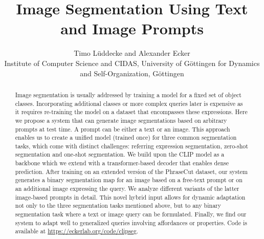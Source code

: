 \documentclass[10pt,twocolumn,letterpaper]{article}
\begin{document}
\title{
Image Segmentation Using Text and Image Prompts
}

\date{}

\author{
Timo Lüddecke and Alexander Ecker \\
\small Institute of Computer Science and CIDAS, University of Göttingen \hspace{1cm}
\smallMPI for Dynamics and Self-Organization, Göttingen
}


\maketitle


\def\todo#1{{ \color{blue}{TODO: #1} } }
\def\new{{ \color{red}{new} } }
\def\remark#1{{ \color{cyan}{#1} } }
\def\question#1{{ \color{orange}{Q: #1} } }

\def\conf#1{}

\newcommand{\x}{\mathbf{x}}
\newcommand{\y}{\mathbf{y}}
\newcommand{\xv}{\mathbf{x}}
\newcommand{\yv}{\mathbf{y}}
\newcommand{\tv}{\mathbf{t}}
\newcommand{\cv}{\mathbf{c}}
\newcommand{\pred}{\mathbf{p}}
\newcommand{\gt}{\mathbf{g}}
\newcommand{\miou}{\text{mIoU}}
\newcommand{\ioufg}{\text{IoU}_{\text{FG}}}
\newcommand{\ioubin}{\text{IoU}_{\text{BIN}}}





\begin{abstract}


Image segmentation is usually addressed by training a model for a fixed set of object classes. Incorporating additional classes or more complex queries later is expensive as it requires re-training the model on a dataset that encompasses these expressions.
Here we propose a system that can generate image segmentations based on arbitrary prompts at test time.
A prompt can be either a text or an image. This approach enables us to create a unified model (trained once) for three common segmentation tasks, which come with distinct challenges: referring expression segmentation, zero-shot segmentation and one-shot segmentation.
We build upon the CLIP model as a backbone which we extend with a transformer-based decoder that enables dense prediction. After training on an extended version of the PhraseCut dataset, our system generates a binary segmentation map for an image based on a free-text prompt or on an additional image expressing the query. 
We analyze different variants of the latter image-based prompts in detail.
This novel hybrid input allows for dynamic adaptation not only to the three segmentation tasks mentioned above, but to any binary segmentation task where a text or image query can be formulated.
Finally, we find our system to adapt well to generalized queries involving affordances or properties.
Code is available at \url{https://eckerlab.org/code/clipseg}.

\end{abstract}
\end{document}
